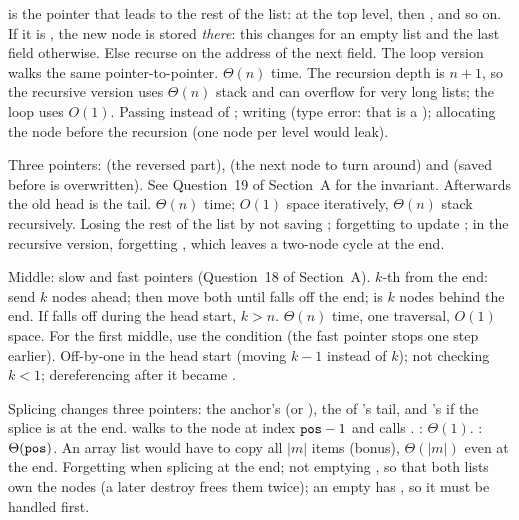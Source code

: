 \idea {} is the pointer that leads to the rest of the list:  at the top
level, then , and so on. If it is , the new node is stored
\emph{there}: this changes  for an empty list and the last  field
otherwise. Else recurse on the address of the next field. The loop version walks the same
pointer-to-pointer.
\complexity $\Theta(n)$ time. The recursion depth is $n+1$, so the recursive version uses
$\Theta(n)$ stack and can overflow for very long lists; the loop uses $O(1)$.
\mistakes Passing  instead of ; writing 
(type error: that is a ); allocating the node before the recursion (one node
per level would leak).

\idea Three pointers:  (the reversed part),  (the next node to turn
around) and  (saved before  is overwritten). See Question~19 of
Section~A for the invariant. Afterwards the old head is the tail.
\complexity $\Theta(n)$ time; $O(1)$ space iteratively, $\Theta(n)$ stack recursively.
\mistakes Losing the rest of the list by not saving ; forgetting to update
; in the recursive version, forgetting , which leaves a
two-node cycle at the end.

\idea Middle: slow and fast pointers (Question~18 of Section~A). $k$-th from the end: send
 $k$ nodes ahead; then move both until  falls off the end;  is
$k$ nodes behind the end. If  falls off during the head start, $k>n$.
\complexity $\Theta(n)$ time, one traversal, $O(1)$ space. For the first middle, use the
condition  (the fast pointer stops
one step earlier).
\mistakes Off-by-one in the head start (moving $k-1$ instead of $k$); not checking $k<1$;
dereferencing  after it became .

\idea Splicing changes three pointers: the anchor's  (or ), the
 of 's tail, and 's  if the splice is at the end. 
walks to the node at index $\texttt{pos}-1$ and calls .
\complexity {}: $\Theta(1)$. : $\Theta(\texttt{pos})$. An array list
would have to copy all $|m|$ items (bonus), $\Theta(|m|)$ even at the end.
\mistakes Forgetting  when splicing at the end; not emptying , so that
both lists own the nodes (a later destroy frees them twice); an empty  has
, so it must be handled first.

